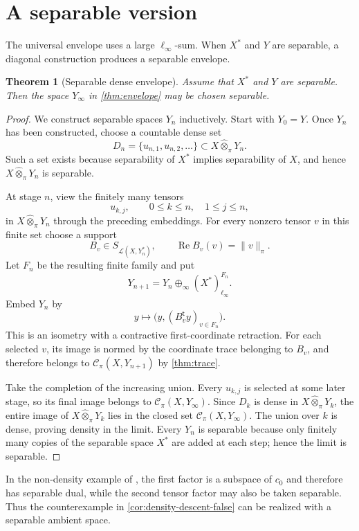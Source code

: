 \documentclass[11pt]{article}
\newtheorem{theorem}{Theorem}[section]
\theoremstyle{definition}
\theoremstyle{remark}
\newcommand{\whot}{\widehat\otimes_\pi}
\newcommand{\Lin}{\mathcal L}
\newcommand{\Rea}{\operatorname{Re}}
\newcommand{\Cpi}{\mathscr C_\pi}
\begin{document}
\section{A separable version}

The universal envelope uses a large $\ell_\infty$-sum.  When $X^*$ and $Y$ are separable, a diagonal construction produces a separable envelope.

\begin{theorem}[Separable dense envelope]\label{thm:separable-envelope}
Assume that $X^*$ and $Y$ are separable.  Then the space $Y_\infty$ in \cref{thm:envelope} may be chosen separable.
\end{theorem}

\begin{proof}
We construct separable spaces $Y_n$ inductively.  Start with $Y_0=Y$.  Once $Y_n$ has been constructed, choose a countable dense set
\[
 D_n=\{u_{n,1},u_{n,2},\ldots\}
 \subset X\whot Y_n.
\]
Such a set exists because separability of $X^*$ implies separability of $X$, and hence $X\whot Y_n$ is separable.

At stage $n$, view the finitely many tensors
\[
 u_{k,j},
 \qquad 0\leq k\leq n,
 \quad 1\leq j\leq n,
\]
in $X\whot Y_n$ through the preceding embeddings.  For every nonzero tensor $v$ in this finite set choose a support
\[
 B_v\in S_{\Lin(X,Y_n^*)},
 \qquad
 \Rea B_v(v)=\|v\|_\pi.
\]
Let $F_n$ be the resulting finite family and put
\[
 Y_{n+1}=Y_n\oplus_\infty (X^*)^{F_n}_{\ell_\infty}.
\]
Embed $Y_n$ by
\[
 y\longmapsto
 \bigl(y,(B_v^{\mathsf t}y)_{v\in F_n}\bigr).
\]
This is an isometry with a contractive first-coordinate retraction.  For each selected $v$, its image is normed by the coordinate trace belonging to $B_v$, and therefore belongs to $\Cpi(X,Y_{n+1})$ by \cref{thm:trace}.

Take the completion of the increasing union.  Every $u_{k,j}$ is selected at some later stage, so its final image belongs to $\Cpi(X,Y_\infty)$.  Since $D_k$ is dense in $X\whot Y_k$, the entire image of $X\whot Y_k$ lies in the closed set $\Cpi(X,Y_\infty)$.  The union over $k$ is dense, proving density in the limit.  Every $Y_n$ is separable because only finitely many copies of the separable space $X^*$ are added at each step; hence the limit is separable.
\end{proof}

In the non-density example of \cite[Theorem 5.1]{DantasEtAl2022}, the first factor is a subspace of $c_0$ and therefore has separable dual, while the second tensor factor may also be taken separable.  Thus the counterexample in \cref{cor:density-descent-false} can be realized with a separable ambient space.
\end{document}
